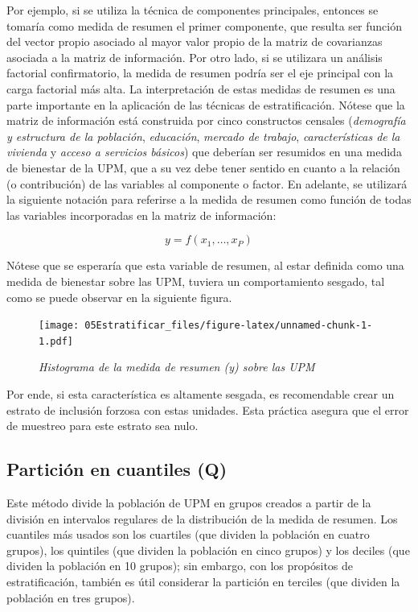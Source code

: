 \documentclass[
  10pt,
  spanish,
]{book}
\begin{document}
Por ejemplo, si se utiliza la técnica de componentes principales, entonces se tomaría como medida de resumen el primer componente, que resulta ser función del vector propio asociado al mayor valor propio de la matriz de covarianzas asociada a la matriz de información. Por otro lado, si se utilizara un análisis factorial confirmatorio, la medida de resumen podría ser el eje principal con la carga factorial más alta. La interpretación de estas medidas de resumen es una parte importante en la aplicación de las técnicas de estratificación. Nótese que la matriz de información está construida por cinco constructos censales (\emph{demografía y estructura de la población}, \emph{educación}, \emph{mercado de trabajo}, \emph{características de la vivienda} y \emph{acceso a servicios básicos}) que deberían ser resumidos en una medida de bienestar de la UPM, que a su vez debe tener sentido en cuanto a la relación (o contribución) de las variables al componente o factor. En adelante, se utilizará la siguiente notación para referirse a la medida de resumen como función de todas las variables incorporadas en la matriz de información:

\[
y = f(x_1,\ldots, x_P)
\]

Nótese que se esperaría que esta variable de resumen, al estar definida como una medida de bienestar sobre las UPM, tuviera un comportamiento sesgado, tal como se puede observar en la siguiente figura.

\begin{figure}
\centering
\texttt{[image: 05Estratificar\_files/figure-latex/unnamed-chunk-1-1.pdf]}
\caption{\label{fig:unnamed-chunk-1}\emph{Histograma de la medida de resumen (y) sobre las UPM}}
\end{figure}

Por ende, si esta característica es altamente sesgada, es recomendable crear un estrato de inclusión forzosa con estas unidades. Esta práctica asegura que el error de muestreo para este estrato sea nulo.

\hypertarget{particiuxf3n-en-cuantiles-q}{%
\subsection*{Partición en cuantiles (Q)}\label{particiuxf3n-en-cuantiles-q}}

Este método divide la población de UPM en grupos creados a partir de la división en intervalos regulares de la distribución de la medida de resumen. Los cuantiles más usados son los cuartiles (que dividen la población en cuatro grupos), los quintiles (que dividen la población en cinco grupos) y los deciles (que dividen la población en 10 grupos); sin embargo, con los propósitos de estratificación, también es útil considerar la partición en terciles (que dividen la población en tres grupos).
\end{document}
